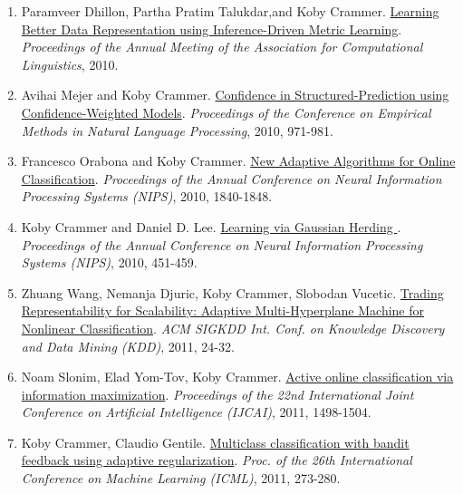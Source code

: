 \documentclass{resume}
\begin{document}
\begin{enumerate}
\item Paramveer Dhillon, Partha Pratim Talukdar,and {Koby Crammer}.
\href{http://webee.technion.ac.il/people/koby/publications/}{Learning Better Data Representation using Inference-Driven Metric Learning}.
{\em Proceedings of the Annual Meeting of the Association for Computational Linguistics}, 2010.

\item Avihai Mejer and {Koby Crammer}.
\href{http://webee.technion.ac.il/people/koby/publications/paper_seq_emnlp10.pdf}{Confidence in Structured-Prediction using Confidence-Weighted Models}.
{\em Proceedings of the Conference on Empirical Methods in Natural
  Language Processing}, 2010, 971-981.

\item Francesco Orabona and {Koby Crammer}.
\href{http://webee.technion.ac.il/people/koby/publications/adaptive_nips10.pdf}{New Adaptive Algorithms for Online Classification}.
{\em Proceedings of the Annual Conference on Neural Information
  Processing Systems (NIPS)}, 2010, 1840-1848.

\item  {Koby Crammer} and Daniel D. Lee.
\href{http://webee.technion.ac.il/people/koby/publications/gaussian_mob_nips10.pdf}{Learning via Gaussian Herding }.
{\em Proceedings of the Annual Conference on Neural Information Processing
  Systems  (NIPS)}, 2010, 451-459.

\item Zhuang Wang, Nemanja Djuric, Koby Crammer, Slobodan Vucetic.
\href{http://webee.technion.ac.il/people/koby/publications/KDD2011.pdf}{Trading Representability for Scalability: Adaptive Multi-Hyperplane Machine for Nonlinear Classification}.
{\em ACM SIGKDD Int. Conf. on Knowledge Discovery and Data Mining
  (KDD)}, 2011, 24-32.

\item Noam Slonim, Elad Yom-Tov, Koby Crammer.
\href{http://webee.technion.ac.il/people/koby/publications/2011_4_14_scy_ijcai_final.pdf}{Active online classification via information maximization}.
{\em Proceedings of the 22nd International Joint Conference on
  Artificial Intelligence (IJCAI)}, 2011, 1498-1504.

\item Koby Crammer, Claudio Gentile.
\href{http://webee.technion.ac.il/people/koby/publications/mcbandit_icml11.pdf}{Multiclass classification with bandit feedback using adaptive regularization}.
{\em Proc. of the 26th International Conference on Machine Learning
  (ICML)}, 2011, 273-280.


\end{enumerate}
\end{document}

